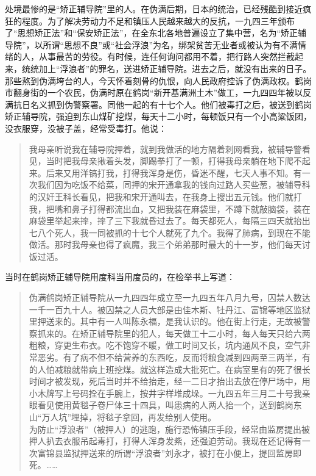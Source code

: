 处境最惨的是“矫正辅导院”里的人。在伪满后期，日本的统治，已经残酷到接近疯狂的程度。为了解决劳动力不足和镇压人民越来越大的反抗，一九四三年颁布了“思想矫正法”和“保安矫正法”，在全东北各地普遍设立了集中营，名为“矫正辅导院”，以所谓“思想不良”或“社会浮浪”为名，绑架贫苦无业者或被认为有不满情绪的人，从事最苦的劳役。有时候，连任何询问都用不着，把行路人突然拦截起来，统统加上“浮浪者”的罪名，送进矫正辅导院。进去之后，就没有出来的日子。那些熬到伪满垮台的人，今天怀着刻骨的仇恨，向人民政府控诉了伪满政权。鹤岗市翻身街的一个农民，伪满时原在鹤岗“新开基满洲土木”做工，一九四四年被以反满抗日名义抓到伪警察署。同他一起的有十七个人。他们被毒打之后，被送到鹤岗矫正辅导院，强迫到东山煤矿挖煤，每天十二小时，每顿饭只有一个小高粱饭团，没衣服穿，没被子盖，经常受毒打。他说：\\

\begin{quote}
	我母亲听说我在辅导院押着，就到我做活的地方隔着刺网看我，被辅导警看见，当时把我母亲揪着头发，脚踢拳打了一顿，打得我母亲躺在地下爬不起来。后来又用洋镐打我，打得我浑身是伤，昏迷不醒，七天人事不知。有一次我们因为吃饭不给菜，同押的宋开通拿我的钱向过路人买些葱，被辅导科的汉奸王科长看见，把我和宋开通叫去，在我身上搜出五元钱。他们就打我，把嘴和鼻子打得都流出血，又把我装在麻袋里，不蹲下就敲脑袋，装在麻袋里举起来摔，摔了三下我就昏过去了。每天都死人，每隔三四天就抬出七八个死人，我一同被抓的十七个人就死了九个。我得了肺病，到现在不能做活。那时我母亲也得了疯魔，我三个弟弟那时最大的十一岁，他们每天讨饭过活。\\
\end{quote}

当时在鹤岗矫正辅导院用度科当用度员的，在检举书上写道：\\

\begin{quote}
	伪满鹤岗矫正辅导院从一九四四年成立至一九四五年八月九号，囚禁人数达一千一百九十人。被囚禁之人员大部是由佳木斯、牡丹江、富锦等地区监狱里押送来的。其中有一人叫陈永福，是我认识的。他在街上行走，无故被警察抓来的。在矫正辅导院里的犯人，每天做工十二小时，每人每天只给六两粗粮，穿更生布衣。吃不饱穿不暖，做工时间又长，坑内通风不良，空气非常恶劣。有了病不但不给营养的东西吃，反而将粮食减到四两至三两半，有的人怕减粮就带病上班挖煤。就这样造成大批死亡。在病室里有的死了很长时间才被发现，死后当时并不给抬走，经一二日才抬出去放在停尸场中，用小木牌写上号码拴在手腕上，按井字样堆成垛。一九四五年三月二十号我亲眼看见使用黄毯子卷尸体三十四具，叫患病的人两人抬一个，送到鹤岗东山“万人坑”埋掉，将毯子拿回，再发给别人使用。\\

为防止“浮浪者”（被押人）的逃跑，施行恐怖镇压手段，经常由监房提出被押人扒去衣服吊起毒打，打得人浑身发紫，还强迫劳动。我现在还记得有一次富锦县监狱押送来的所谓“浮浪者”刘永才，被打在小便上，提回监房即死。……\\
\end{quote}

